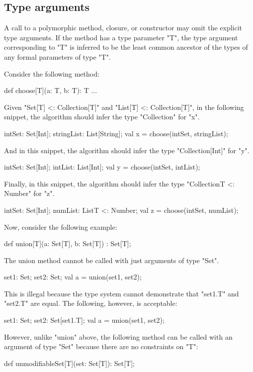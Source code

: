 \subsection{Type arguments}

A call to a polymorphic method, closure, or constructor may omit the
explicit type arguments.  If the method has a type parameter
\xcd"T", the type argument corresponding to \xcd"T" is inferred
to be the least common ancestor of the types of any formal
parameters of type \xcd"T".

Consider the following method:
\begin{xten}
def choose[T](a: T, b: T): T { ... }
\end{xten}
%
Given \xcd"Set[T] <: Collection[T]"
and \xcd"List[T] <: Collection[T]",
in the following snippet, the algorithm should infer the type
\xcd"Collection" for \xcd"x".
\begin{xten}
intSet: Set[Int];
stringList: List[String];
val x = choose(intSet, stringList);
\end{xten}
%
And in this snippet, the algorithm should infer the type
\xcd"Collection[Int]" for \xcd"y".
\begin{xten}
intSet: Set[Int];
intList: List[Int];
val y = choose(intSet, intList);
\end{xten}
%
Finally, in this snippet, the algorithm should infer the type
\xcd"Collection{T <: Number}" for \xcd"z".
\begin{xten}
intSet: Set[Int];
numList: List{T <: Number};
val z = choose(intSet, numList);
\end{xten}

Now, consider the following example:
\begin{xten}
def union[T](a: Set[T], b: Set[T]) : Set[T];
\end{xten}
The union method cannot be called with just arguments of type \xcd"Set".
\begin{xten}
set1: Set;
set2: Set;
val a = union(set1, set2);
\end{xten}
This is illegal because the type system cannot demonstrate that
\xcd"set1.T" and \xcd"set2.T" are equal.
The following, however, is acceptable:
\begin{xten}
set1: Set;
set2: Set[set1.T];
val a = union(set1, set2);
\end{xten}

However, unlike \xcd"union" above,
the following method can be called with an argument of type \xcd"Set"
because there are no constraints on \xcd"T":
\begin{xten}
def unmodifiableSet[T](set: Set[T]): Set[T];
\end{xten}


